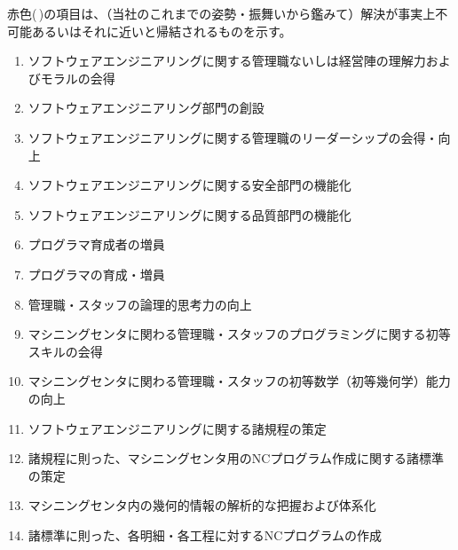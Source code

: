 \clearpage
赤色(\,\sarrow[red]\!)の項目は、（当社のこれまでの姿勢・振舞いから鑑みて）解決が事実上不可能あるいはそれに近いと帰結されるものを示す。
\begin{enumerate}[label=\sarrow]
\item[{\sarrow[red]}] ソフトウェアエンジニアリングに関する管理職ないしは経営陣の理解力およびモラルの会得
\item[{\sarrow[red]}] ソフトウェアエンジニアリング部門の創設
\item[{\sarrow[red]}] ソフトウェアエンジニアリングに関する管理職のリーダーシップの会得・向上
\item[{\sarrow[red]}] ソフトウェアエンジニアリングに関する安全部門の機能化
\item[{\sarrow[red]}] ソフトウェアエンジニアリングに関する品質部門の機能化
\item[{\sarrow[red]}] プログラマ育成者の増員
\item[{\sarrow[red]}] プログラマの育成・増員
\item[{\sarrow[red]}] 管理職・スタッフの論理的思考力の向上
\item[{\sarrow[red]}] マシニングセンタに関わる管理職・スタッフのプログラミングに関する初等スキルの会得
\item[{\sarrow[red]}] マシニングセンタに関わる管理職・スタッフの初等数学（初等幾何学）能力の向上
\item ソフトウェアエンジニアリングに関する諸規程の策定
\item 諸規程に則った、マシニングセンタ用のNCプログラム作成に関する諸標準の策定
\item マシニングセンタ内の幾何的情報の解析的な把握および体系化
\item 諸標準に則った、各明細・各工程に対するNCプログラムの作成
\end{enumerate}


